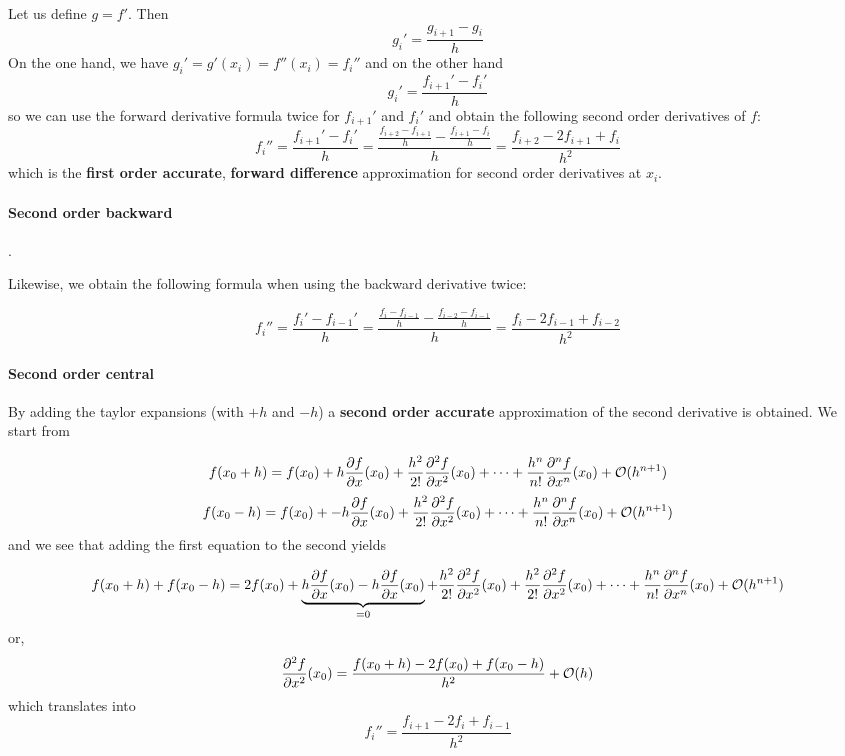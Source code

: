 Let us define $g=f'$. Then 
\[
g_i' = \frac{g_{i+1}-g_{i}}{h}
\]
On the one hand, we have $g_i'=g'(x_i)=f''(x_i)=f_i''$ and on the other hand
\[
g_i' = \frac{f_{i+1}'-f_{i}'}{h}
\]
so we can use the forward derivative formula twice for $f_{i+1}'$ and $f_{i}'$ and 
obtain the following second order derivatives of $f$:
\[
f_{i}'' 
= \frac{f_{i+1}'-f_i'}{h} 
= \frac{\frac{f_{i+2}-f_{i+1}}{h}-
\frac{f_{i+1}-f_i}{h}
}{h} 
= \frac{f_{i+2}-2f_{i+1}+f_i}{h^2} 
\]
which is the {\bf first order accurate}, {\bf forward difference} approximation for
second order derivatives at $x_{i}$.

\paragraph{Second order backward}. 

Likewise, we obtain the following formula when using the backward derivative twice:

\[
f_{i}'' 
= \frac{f_{i}'-f_{i-1}'}{h} 
= \frac{\frac{f_{i}-f_{i-1}}{h}- \frac{f_{i-2}-f_{i-1}}{h}  }{h} 
= \frac{f_{i}-2f_{i-1}+f_{i-2}}{h^2} 
\]





\paragraph{Second order central} 
By adding the taylor expansions (with $+h$ and $-h$) 
a {\bf second order accurate}  approximation of the second derivative is obtained.
We start from 

\[
f(x_0+h)=f(x_0)+ 
h \frac{\partial f}{\partial x}(x_0)  + 
\frac{h^2}{2!} \frac{\partial^2 f}{\partial x^2}(x_0)  +
\dots  +
\frac{h^n}{n!} \frac{\partial^n f}{\partial x^n}(x_0)  
+ {\cal O}(h^{n+1})
\]
\[
f(x_0-h)=f(x_0)+ 
-h \frac{\partial f}{\partial x}(x_0)  + 
\frac{h^2}{2!} \frac{\partial^2 f}{\partial x^2}(x_0)  +
\dots  +
\frac{h^n}{n!} \frac{\partial^n f}{\partial x^n}(x_0)  
+ {\cal O}(h^{n+1})
\]
and we see that adding the first equation to the second yields

\[
f(x_0+h) + f(x_0-h) =2 f(x_0)+ 
\underbrace{h \frac{\partial f}{\partial x}(x_0)   
-h \frac{\partial f}{\partial x}(x_0)}_{=0}  + 
\frac{h^2}{2!} \frac{\partial^2 f}{\partial x^2}(x_0)  +
\frac{h^2}{2!} \frac{\partial^2 f}{\partial x^2}(x_0)  +
\dots  +
\frac{h^n}{n!} \frac{\partial^n f}{\partial x^n}(x_0)  
+ {\cal O}(h^{n+1})
\]
or, 
\[
\frac{\partial^2 f}{\partial x^2}(x_0)  =
\frac{f(x_0+h) -2f(x_0) + f(x_0-h) }{h^2}
+ {\cal O}(h)
\] 
which translates into
\[
f_{i}''=\frac{f_{i+1}-2f_i+f_{i-1}}{h^2} 
\]


